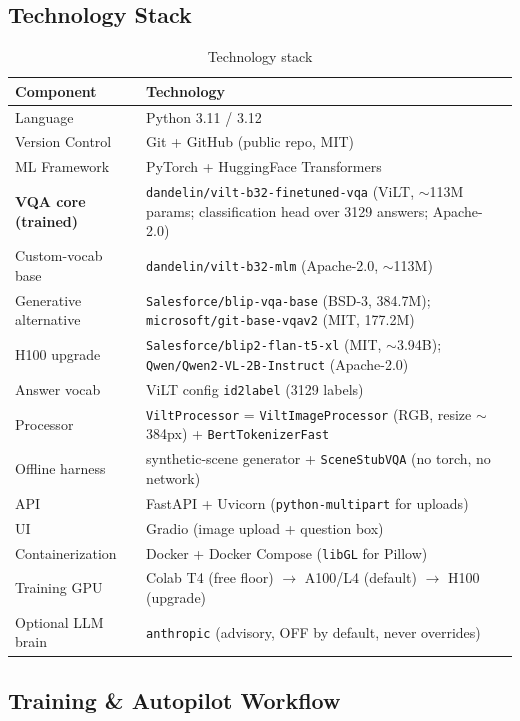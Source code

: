 \documentclass[12pt,a4paper]{article}
\begin{document}
\subsection{Technology Stack}

\begin{table}[H]
\centering
\caption{Technology stack}
\small
\begin{tabularx}{\linewidth}{@{} l L @{}}
\toprule
\textbf{Component} & \textbf{Technology} \\
\midrule
Language & Python 3.11 / 3.12 \\
Version Control & Git + GitHub (public repo, MIT) \\
ML Framework & PyTorch + HuggingFace Transformers \\
\textbf{VQA core (trained)} & \texttt{dandelin/vilt-b32-finetuned-vqa} (ViLT, $\sim$113M params; classification head over 3129 answers; Apache-2.0) \\
Custom-vocab base & \texttt{dandelin/vilt-b32-mlm} (Apache-2.0, $\sim$113M) \\
Generative alternative & \texttt{Salesforce/blip-vqa-base} (BSD-3, 384.7M); \texttt{microsoft/git-base-vqav2} (MIT, 177.2M) \\
H100 upgrade & \texttt{Salesforce/blip2-flan-t5-xl} (MIT, $\sim$3.94B); \texttt{Qwen/Qwen2-VL-2B-Instruct} (Apache-2.0) \\
Answer vocab & ViLT config \texttt{id2label} (3129 labels) \\
Processor & \texttt{ViltProcessor} = \texttt{ViltImageProcessor} (RGB, resize $\sim$384px) + \texttt{BertTokenizerFast} \\
Offline harness & synthetic-scene generator + \texttt{SceneStubVQA} (no torch, no network) \\
API & FastAPI + Uvicorn (\texttt{python-multipart} for uploads) \\
UI & Gradio (image upload + question box) \\
Containerization & Docker + Docker Compose (\texttt{libGL} for Pillow) \\
Training GPU & Colab T4 (free floor) $\rightarrow$ A100/L4 (default) $\rightarrow$ H100 (upgrade) \\
Optional LLM brain & \texttt{anthropic} (advisory, OFF by default, never overrides) \\
\bottomrule
\end{tabularx}
\end{table}

\subsection{Training \& Autopilot Workflow}
\label{subsec:workflow}
\end{document}
